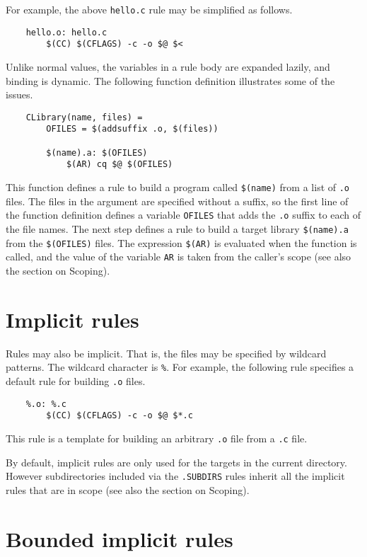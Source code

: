 For example, the above \verb+hello.c+ rule may be simplified as follows.

\begin{verbatim}
    hello.o: hello.c
        $(CC) $(CFLAGS) -c -o $@ $<
\end{verbatim}

Unlike normal values, the variables in a rule body are expanded lazily, and binding is dynamic.  The
following function definition illustrates some of the issues.

\begin{verbatim}
    CLibrary(name, files) =
        OFILES = $(addsuffix .o, $(files))

        $(name).a: $(OFILES)
            $(AR) cq $@ $(OFILES)
\end{verbatim}

This function defines a rule to build a program called \verb+$(name)+ from a list of \verb+.o+
files.  The files in the argument are specified without a suffix, so the first line of the function
definition defines a variable \verb+OFILES+ that adds the \verb+.o+ suffix to each of the file
names.  The next step defines a rule to build a target library \verb+$(name).a+ from the
\verb+$(OFILES)+ files. The expression \verb+$(AR)+ is evaluated when the function is called, and
the value of the variable \verb+AR+ is taken from the caller's scope (see also the section on
Scoping).

\section{Implicit rules}

Rules may also be implicit.  That is, the files may be specified by wildcard patterns.
The wildcard character is \verb+%+.  For example, the following rule specifies a default
rule for building \verb+.o+ files.

\begin{verbatim}
    %.o: %.c
        $(CC) $(CFLAGS) -c -o $@ $*.c
\end{verbatim}

This rule is a template for building an arbitrary \verb+.o+ file from
a \verb+.c+ file.

By default, implicit rules are only used for the targets in the current
directory. However subdirectories included via the \verb+.SUBDIRS+ rules
inherit all the implicit rules that are in scope (see also the section on
Scoping).

\section{Bounded implicit rules}

